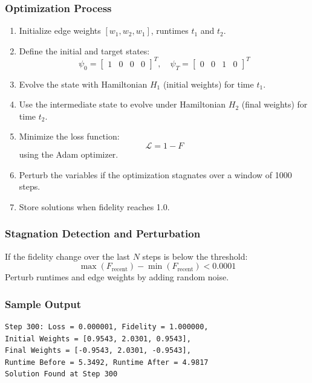 \documentclass[aps]{revtex4-2}
\begin{document}
\subsubsection{Optimization Process}
\begin{enumerate}
    \item Initialize edge weights $[w_1, w_2, w_1]$, runtimes $t_1$ and $t_2$.
    \item Define the initial and target states:
    \[
    \psi_0 = \begin{bmatrix} 1 & 0 & 0 & 0 \end{bmatrix}^T, \quad
    \psi_T = \begin{bmatrix} 0 & 0 & 1 & 0 \end{bmatrix}^T
    \]
    \item Evolve the state with Hamiltonian $H_1$ (initial weights) for time $t_1$.
    \item Use the intermediate state to evolve under Hamiltonian $H_2$ (final weights) for time $t_2$.
    \item Minimize the loss function:
    \[
    \mathcal{L} = 1 - F
    \]
    using the Adam optimizer.
    \item Perturb the variables if the optimization stagnates over a window of 1000 steps.
    \item Store solutions when fidelity reaches 1.0.
\end{enumerate}

\subsubsection{Stagnation Detection and Perturbation}
\noindent If the fidelity change over the last $N$ steps is below the threshold:
\[
\max(F_{\text{recent}}) - \min(F_{\text{recent}}) < 0.0001
\]
Perturb runtimes and edge weights by adding random noise.
\subsubsection{Sample Output}

\begin{verbatim}
Step 300: Loss = 0.000001, Fidelity = 1.000000,
Initial Weights = [0.9543, 2.0301, 0.9543],
Final Weights = [-0.9543, 2.0301, -0.9543],
Runtime Before = 5.3492, Runtime After = 4.9817
Solution Found at Step 300
\end{verbatim}
\end{document}
